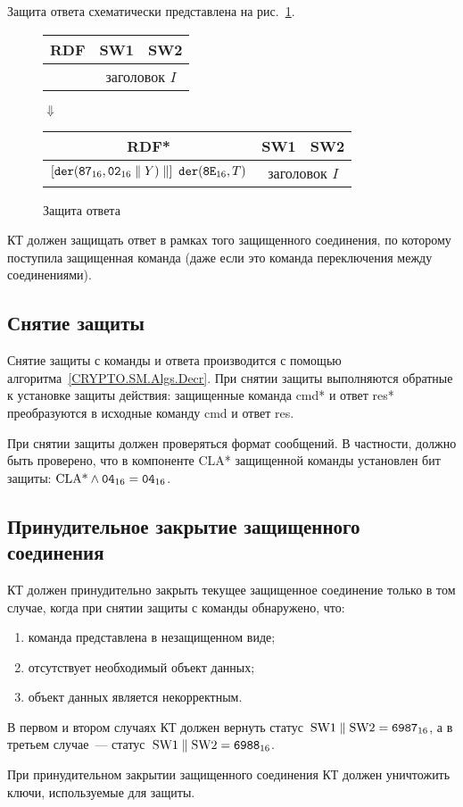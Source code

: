 Защита ответа схематически представлена на рис.~\ref{Fig.CMDS.ResEncr}. 

\begin{figure}[!h]
\begin{center}
\begin{tabular}{|c|c|c|}
\hline
RDF & SW1 & SW2 \\
\hline
\hline
[сообщение $X$] & \multicolumn{2}{|c|}{заголовок $I$} \\
\hline
\end{tabular}

\vskip3pt$\Downarrow$\vskip3pt

\begin{tabular}{|c|c|c|}
\hline
RDF* & SW1 & SW2 \\
\hline
\hline
$\left[\texttt{der}(\texttt{87}_{16},\texttt{02}_{16}\parallel Y)\parallel\right]\ \texttt{der}(\texttt{8E}_{16},T)$ & 
\multicolumn{2}{|c|}{заголовок $I$} \\
\hline
\end{tabular}
\end{center}
\caption{Защита ответа}\label{Fig.CMDS.ResEncr}
\end{figure}

КТ должен защищать ответ в рамках того защищенного соединения,
по которому поступила защищенная команда (даже если это команда 
переключения между соединениями). 

\subsection{Снятие защиты}\label{CMDS.SM.Decr}

Снятие защиты с команды и ответа производится с помощью 
алгоритма~\ref{CRYPTO.SM.Algs.Decr}.  
При снятии защиты выполняются обратные к установке защиты действия: 
защищенные команда cmd* и ответ res* преобразуются в исходные команду cmd  
и ответ res.  

При снятии защиты должен проверяться формат сообщений.
В частности, должно быть проверено, что в компоненте CLA* 
защищенной команды установлен бит защиты:
$\text{CLA*}\wedge\texttt{04}_{16}=\texttt{04}_{16}$.

\subsection{Принудительное закрытие защищенного соединения}
\label{CMDS.SM.Stop}

КТ должен принудительно закрыть текущее защищенное соединение только в том 
случае, когда при снятии защиты с команды обнаружено, что: 
\begin{enumerate}
\item[1)] команда представлена в незащищенном виде;
\item[2)] отсутствует необходимый объект данных;
\item[3)] объект данных является некорректным.
\end{enumerate}

В первом и втором случаях КТ должен вернуть 
статус~$\text{SW1} \parallel \text{SW2} = \texttt{6987}_{16}$, 
а в третьем случае~--- статус~$\text{SW1} \parallel \text{SW2} = 
\texttt{6988}_{16}$.  

При принудительном закрытии защищенного соединения КТ должен уничтожить 
ключи, используемые для защиты. 
